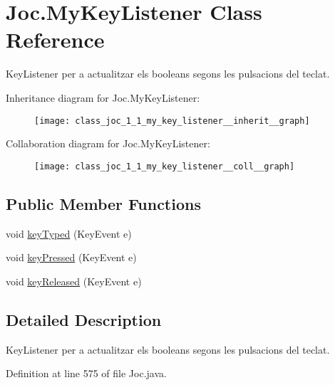 \hypertarget{class_joc_1_1_my_key_listener}{}\section{Joc.\+My\+Key\+Listener Class Reference}
\label{class_joc_1_1_my_key_listener}


Key\+Listener per a actualitzar els booleans segons les pulsacions del teclat.  




Inheritance diagram for Joc.\+My\+Key\+Listener\+:\nopagebreak
\begin{figure}[H]
\begin{center}
\leavevmode
\texttt{[image: class\_joc\_1\_1\_my\_key\_listener\_\_inherit\_\_graph]}
\end{center}
\end{figure}


Collaboration diagram for Joc.\+My\+Key\+Listener\+:\nopagebreak
\begin{figure}[H]
\begin{center}
\leavevmode
\texttt{[image: class\_joc\_1\_1\_my\_key\_listener\_\_coll\_\_graph]}
\end{center}
\end{figure}
\subsection*{Public Member Functions}
\begin{DoxyCompactItemize}
\item 
void \hyperlink{class_joc_1_1_my_key_listener_a4ca06e4f3950c3745be88c484f12df85}{key\+Typed} (Key\+Event e)
\item 
void \hyperlink{class_joc_1_1_my_key_listener_a14addef50fc960bcd8e4ce5cc3d9c643}{key\+Pressed} (Key\+Event e)
\item 
void \hyperlink{class_joc_1_1_my_key_listener_af5f550e0c17018b1bce4648782aaa9fb}{key\+Released} (Key\+Event e)
\end{DoxyCompactItemize}


\subsection{Detailed Description}
Key\+Listener per a actualitzar els booleans segons les pulsacions del teclat. 

Definition at line 575 of file Joc.\+java.



